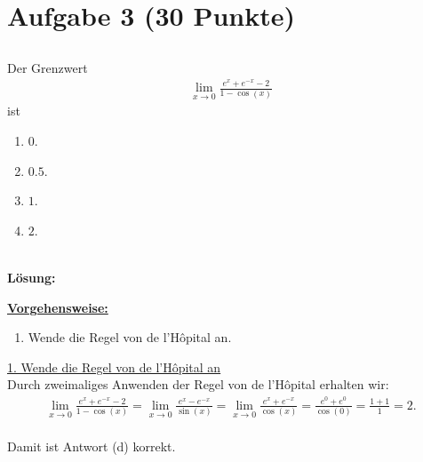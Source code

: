 \section*{Aufgabe 3 (30 Punkte)}
\vspace{0.4cm}
\subsection*{}
Der  Grenzwert
\begin{align*}
\lim \limits_{x\to 0} 
\frac{e^x + e^{-x} -2}{1 - \cos(x)}
\end{align*}
ist
\renewcommand{\labelenumi}{(\alph{enumi})}
\begin{enumerate}
	\item 
	$ 0 $.
	\item
	$ 0.5 $.
	\item
	$ 1 $.
	\item
	$ 2 $.
\end{enumerate}
\ \\
\textbf{Lösung:}
\begin{mdframed}
\underline{\textbf{Vorgehensweise:}}
\renewcommand{\labelenumi}{\theenumi.}
\begin{enumerate}
\item Wende die Regel von de l'H\^{o}pital an.
\end{enumerate}
\end{mdframed}

\underline{1. Wende die Regel von de l'H\^{o}pital an}\\

Durch zweimaliges Anwenden der Regel von de l'H\^{o}pital erhalten wir:
\begin{align*}
\lim \limits_{x \to 0}
\frac{e^x + e^{-x} -2}{1 - \cos(x)}
=
\lim \limits_{x \to 0}
\frac{e^x - e^{-x}}{ \sin(x)}
=
\lim \limits_{x \to 0}
\frac{e^x + e^{-x}}{ \cos(x)}
=
\frac{e^0 + e^{0}}{ \cos(0)} = \frac{1+1}{1} = 2. 
\end{align*}
\ \\
Damit ist Antwort (d) korrekt.
 
\newpage

